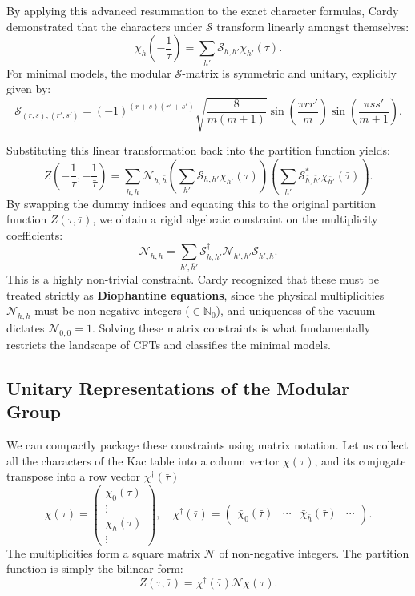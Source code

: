 By applying this advanced resummation to the exact character formulas, Cardy demonstrated that the characters under $\mathcal{S}$ transform linearly amongst themselves:
\[
    \chi_h\left(-\frac{1}{\tau}\right) = \sum_{h'} \mathcal{S}_{h, h'} \chi_{h'}(\tau).
\]
For minimal models, the modular $\mathcal{S}$-matrix is symmetric and unitary, explicitly given by:
\[
    \mathcal{S}_{(r,s), (r',s')} = (-1)^{(r+s)(r'+s')} \sqrt{\frac{8}{m(m+1)}} \sin \left( \frac{\pi r r'}{m} \right) \sin \left( \frac{\pi s s'}{m+1} \right).
\]

Substituting this linear transformation back into the partition function yields:
\[
    Z\left(-\frac{1}{\tau}, -\frac{1}{\bar{\tau}}\right) = \sum_{h, \bar{h}} \mathcal{N}_{h,\bar{h}} \left( \sum_{h'} \mathcal{S}_{h, h'} \chi_{h'}(\tau) \right) \left( \sum_{\bar{h}'} \mathcal{S}_{\bar{h}, \bar{h}'}^* \chi_{\bar{h}'}(\bar{\tau}) \right).
\]
By swapping the dummy indices and equating this to the original partition function $Z(\tau, \bar{\tau})$, we obtain a rigid algebraic constraint on the multiplicity coefficients:
\[
    \mathcal{N}_{h, \bar{h}} = \sum_{h', \bar{h}'} \mathcal{S}_{h, h'}^\dagger \mathcal{N}_{h', \bar{h}'} \mathcal{S}_{\bar{h}', \bar{h}}.
\]
This is a highly non-trivial constraint. Cardy recognized that these must be treated strictly as \textbf{Diophantine equations}, since the physical multiplicities $\mathcal{N}_{h,\bar{h}}$ must be non-negative integers ($\in \mathbb{N}_0$), and uniqueness of the vacuum dictates $\mathcal{N}_{0,0} = 1$. Solving these matrix constraints is what fundamentally restricts the landscape of CFTs and classifies the minimal models.

\subsection{Unitary Representations of the Modular Group}

We can compactly package these constraints using matrix notation. Let us collect all the characters of the Kac table into a column vector $\chi(\tau)$, and its conjugate transpose into a row vector $\chi^\dagger(\bar{\tau})$
\[
    \chi(\tau) = \begin{pmatrix}
        \chi_{0}(\tau) \\
        \vdots         \\
        \chi_{h}(\tau) \\
        \vdots
    \end{pmatrix}, \quad \chi^\dagger(\bar{\tau}) = \begin{pmatrix}
        \bar{\chi}_{0}(\bar{\tau}) & \cdots & \bar{\chi}_{\bar{h}}(\bar{\tau}) & \cdots
    \end{pmatrix}.
\]
The multiplicities form a square matrix $\mathcal{N}$ of non-negative integers. The partition function is simply the bilinear form:
\[
    Z(\tau, \bar{\tau}) = \chi^\dagger(\bar{\tau}) \mathcal{N} \chi(\tau).
\]

